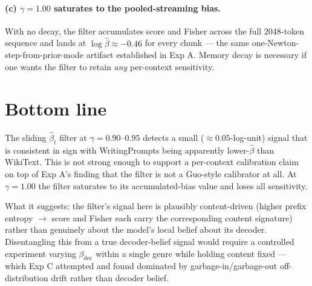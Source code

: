 \documentclass[11pt]{article}
\begin{document}
\paragraph{(c) $\gamma = 1.00$ saturates to the pooled-streaming bias.}
With no decay, the filter accumulates score and Fisher across the full
2048-token sequence and lands at $\log\hat\beta \approx -0.46$ for every
chunk --- the same one-Newton-step-from-prior-mode artifact established in
Exp A.  Memory decay is necessary if one wants the filter to retain
\emph{any} per-context sensitivity.

\section{Bottom line}

The sliding $\hat\beta_t$ filter at $\gamma = 0.90$--$0.95$ detects a
small ($\approx 0.05$-log-unit) signal that is consistent in sign with
WritingPrompts being apparently lower-$\hat\beta$ than WikiText.  This is
not strong enough to support a per-context calibration claim on top of
Exp A's finding that the filter is not a Guo-style calibrator at all.  At
$\gamma = 1.00$ the filter saturates to its accumulated-bias value and
loses all sensitivity.

What it suggests: the filter's signal here is plausibly content-driven
(higher prefix entropy $\to$ score and Fisher each carry the corresponding
content signature) rather than genuinely about the model's local belief
about its decoder.  Disentangling this from a true decoder-belief signal
would require a controlled experiment varying $\beta_{\mathrm{dec}}$
within a single genre while holding content fixed --- which Exp C
attempted and found dominated by garbage-in/garbage-out off-distribution
drift rather than decoder belief.
\end{document}

